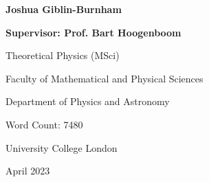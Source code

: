\begin{titlepage}
\begin{center}
\vspace{0.5cm}
        
\Large{\textbf{Joshua Giblin-Burnham}}

\Large{\textbf{Supervisor: Prof. Bart Hoogenboom}}


\vspace{0.5cm}

Theoretical Physics (MSci)

\large{Faculty of Mathematical and Physical Sciences

Department of Physics and Astronomy}

\vfill\vspace{0.8cm}
 

\vspace{0.2cm}
Word Count: 7480

\Large
University College London

April 2023 


\end{center}
\end{titlepage}